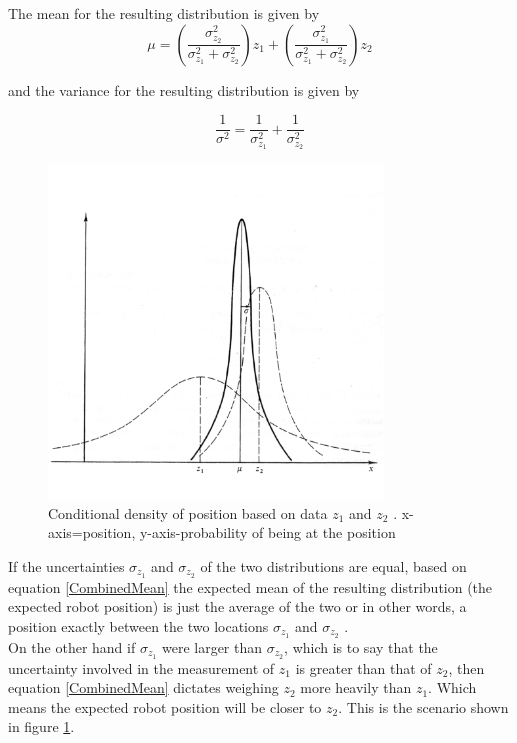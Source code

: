 \documentclass[conference]{IEEEtran}
\begin{document}
The mean for the resulting distribution is given by \cite{maybeck}
\begin{equation}\label{CombinedMean}
\mu = (\frac{\sigma_{z_2}^2}{\sigma_{z_1}^2 + \sigma_{z_2}^2})z_1 + (\frac{\sigma_{z_1}^2}{\sigma_{z_1}^2 + \sigma_{z_2}^2})z_2
\end{equation}

and the variance for the resulting distribution is given by

\begin{equation}\label{CombinedVariance}
\frac{1}{\sigma^2}=\frac{1}{\sigma_{z_1}^2}+\frac{1}{\sigma_{z_2}^2}
\end{equation}

\begin{figure}
\centering
\includegraphics[width=3.5in, height=3.5in]{./figures/CombineGaussians.png}
\caption{Conditional density of position based on data $z_1$ and $z_2$ \cite{maybeck}. x-axis=position, y-axis-probability of being at the position}
\label{CombineGaussians}
\end{figure}

If the uncertainties $\sigma_{z_1}$ and $\sigma_{z_2}$ of the two distributions are equal, based on equation \ref{CombinedMean} the expected mean of the resulting distribution (the expected robot position) is just the average of the two or in other words, a position exactly between the two locations $\sigma_{z_1}$ and $\sigma_{z_2}$ \cite{maybeck}.\\

On the other hand if $\sigma_{z_1}$ were larger than $\sigma_{z_2}$, which is to say that the uncertainty involved in the measurement of $z_1$ is greater than that of $z_2$, then equation \ref{CombinedMean} dictates weighing $z_2$ more heavily than $z_1$. Which means the expected robot position will be closer to $z_2$. This is the scenario shown in figure \ref{CombineGaussians}.\\
\end{document}
